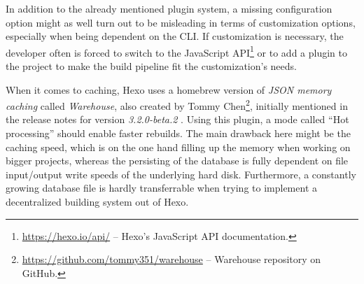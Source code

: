 In addition to the already mentioned plugin system, a missing configuration option might as well turn out to be misleading in terms of customization options, especially when being dependent on the CLI. If customization is necessary, the developer often is forced to switch to the JavaScript API\footnote{\url{https://hexo.io/api/} -- Hexo's JavaScript API documentation.} or to add a plugin to the project to make the build pipeline fit the customization's needs.

When it comes to caching, Hexo uses a homebrew version of \emph{JSON memory caching} called \emph{Warehouse}, also created by Tommy Chen\footnote{\url{https://github.com/tommy351/warehouse} -- Warehouse repository on GitHub.}, initially mentioned in the release notes for version \emph{3.2.0-beta.2} \cite{Chen2015hexorelease}. Using this plugin, a mode called ``Hot processing'' should enable faster rebuilds. The main drawback here might be the caching speed, which is on the one hand filling up the memory when working on bigger projects, whereas the persisting of the database is fully dependent on file input/output write speeds of the underlying hard disk.
Furthermore, a constantly growing database file is hardly transferrable when trying to implement a decentralized building system out of Hexo.
